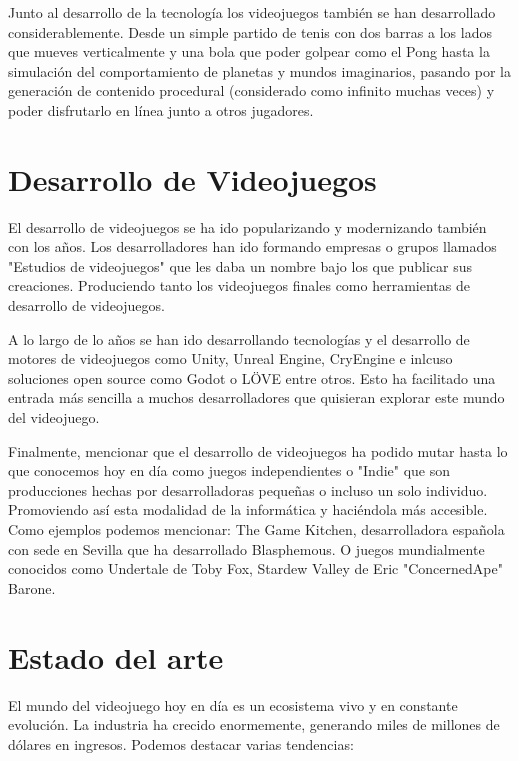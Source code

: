  Junto al desarrollo de la tecnología los videojuegos también se han desarrollado considerablemente. Desde un simple partido de tenis con dos barras a los lados que mueves verticalmente y una bola que poder golpear como el Pong hasta la simulación del comportamiento de planetas y mundos imaginarios, pasando por la generación de contenido procedural (considerado como infinito muchas veces) y poder disfrutarlo en línea junto a otros jugadores.



\section{Desarrollo de Videojuegos}

El desarrollo de videojuegos se ha ido popularizando y modernizando también con los años. Los desarrolladores han ido formando empresas o grupos llamados "Estudios de videojuegos" que les daba un nombre bajo los que publicar sus creaciones. Produciendo tanto los videojuegos finales como herramientas de desarrollo de videojuegos.

A lo largo de lo años se han ido desarrollando tecnologías y el desarrollo de motores de videojuegos como Unity, Unreal Engine, CryEngine e inlcuso soluciones open source como Godot o LÖVE entre otros. Esto ha facilitado una entrada más sencilla a muchos desarrolladores que quisieran explorar este mundo del videojuego.

Finalmente, mencionar que el desarrollo de videojuegos ha podido mutar hasta lo que conocemos hoy en día como juegos independientes o "Indie" que son producciones hechas por desarrolladoras pequeñas o incluso un solo individuo. Promoviendo así esta modalidad de la informática y haciéndola más accesible. Como ejemplos podemos mencionar:
The Game Kitchen, desarrolladora española con sede en Sevilla que ha desarrollado Blasphemous. O juegos mundialmente conocidos como Undertale de Toby Fox, Stardew Valley de Eric "ConcernedApe" Barone. 



\section{Estado del arte}

El mundo del videojuego hoy en día es un ecosistema vivo y en constante evolución. La industria ha crecido enormemente, generando miles de millones de dólares en ingresos. Podemos destacar varias tendencias: 

